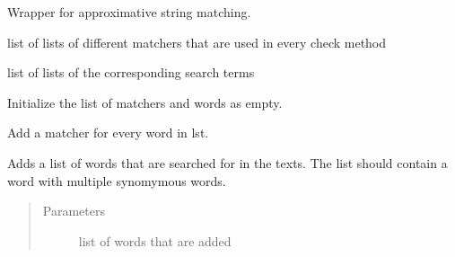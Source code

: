 \documentclass[letterpaper,10pt,english]{sphinxmanual}
\begin{document}
\begin{fulllineitems}
\label{\detokenize{api:simple_check.SimpleCheck}}
Wrapper for approximative string matching.

\begin{fulllineitems}
\label{\detokenize{api:simple_check.SimpleCheck.matchers_lst}}
list of lists of different matchers that are
used in every check method

\end{fulllineitems}


\begin{fulllineitems}
\label{\detokenize{api:simple_check.SimpleCheck.words_lst}}
list of lists of the corresponding search terms

\end{fulllineitems}


\begin{fulllineitems}
\label{\detokenize{api:simple_check.SimpleCheck.__init__}}
Initialize the list of matchers and words as empty.

\end{fulllineitems}


\begin{fulllineitems}
\label{\detokenize{api:simple_check.SimpleCheck.add_list}}
Add a matcher for every word in lst.

Adds a list of words that are searched for in the texts. The
list should contain a word with multiple synomymous words.
\begin{quote}\begin{description}
\item[{Parameters}] \leavevmode
{} \textendash{} list of words that are added

\end{description}\end{quote}


\end{fulllineitems}
\end{fulllineitems}
\end{document}
